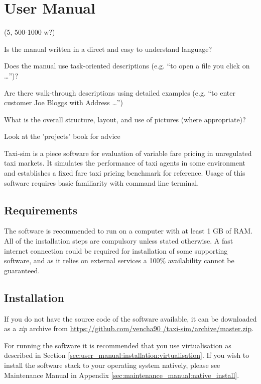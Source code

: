 \newpage
\section{User Manual}
\label{sec:user_manual}


(5, 500-1000 w?)

Is the manual written in a direct and easy to understand language?

Does the manual use task-oriented descriptions (e.g. “to open a file you click
on …”)?

Are there walk-through descriptions using detailed examples (e.g. “to enter
customer Joe Bloggs with Address …”)

What is the overall structure, layout, and use of pictures (where appropriate)?

Look at the 'projects' book for advice


Taxi-sim is a piece software for evaluation of variable fare pricing in
unregulated taxi markets. It simulates the performance of taxi agents in some
environment and establishes a fixed fare taxi pricing benchmark for reference.
Usage of this software requires basic familiarity with command line terminal.


\subsection{Requirements}

The software is recommended to run on a computer with at least 1 GB of RAM. All
of the installation steps are compulsory unless stated otherwise. A fast
internet connection could be required for installation of some supporting
software, and as it relies on external services a 100\% availability cannot be
guaranteed.


\subsection{Installation}
\label{sec:user_manual:installation}

If you do not have the source code of the software available, it can be
downloaded as a \textit{zip} archive from \url{https://github.com/vencha90
/taxi-sim/archive/master.zip}.

For running the software it is recommended that you use virtualisation as
described in Section \ref{sec:user_manual:installation:virtualisation}. If you
wish to install the software stack to your operating system natively, please
see Maintenance Manual in Appendix \ref{sec:maintenance_manual:native_install}.


